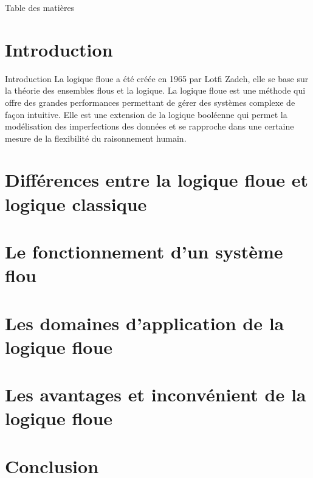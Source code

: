 \documentclass[aspectratio=169,professionalfonts, 12pt]{beamer}
\date{\today}
\begin{document}

\begin{frame}[plain]
  \titlepage
\end{frame}

  

  \begin{frame}[plain]{Table des matières}
    \tableofcontents
  \end{frame}

\section{Introduction}

\begin{frame}{Introduction}
  La logique floue a été créée en 1965 par Lotfi Zadeh, elle se base sur la théorie
  des ensembles flous et la logique. La logique floue est une méthode qui offre des grandes
  performances permettant de gérer des systèmes complexe de façon intuitive. Elle est
  une extension de la logique booléenne qui permet la modélisation des imperfections des données
  et se rapproche dans une certaine mesure de la flexibilité du raisonnement humain.
\end{frame}

\section{Différences entre la logique floue et logique classique}
\section{Le fonctionnement d’un système flou}
\section{Les domaines d’application de la logique floue}
\section{Les avantages et inconvénient de la logique floue}
\section{Conclusion}
\end{document}
